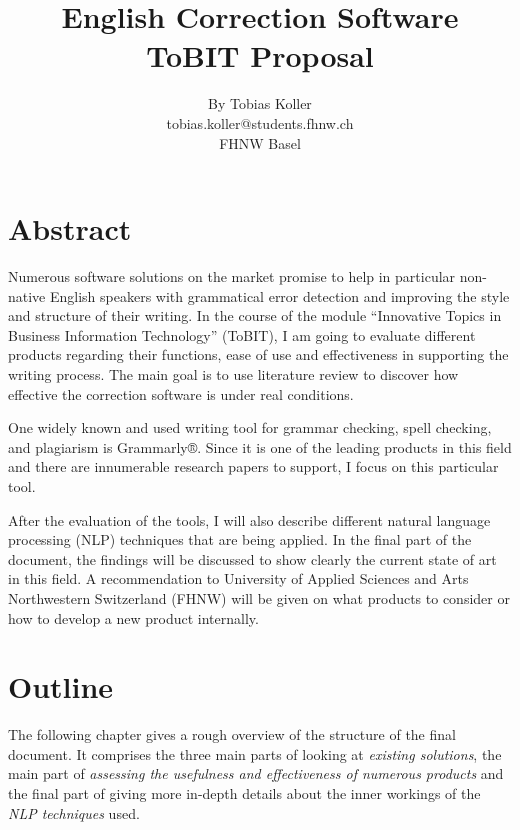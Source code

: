 \documentclass[a4paper,12pt,titlepage]{article}
\begin{document}
\title{\Large{\textbf{English Correction Software}}\\ ToBIT Proposal}
\author{By Tobias Koller \\ tobias.koller@students.fhnw.ch \\ FHNW Basel}

\maketitle
\let\cleardoublepage\clearpage
{}

\section{Abstract}
Numerous software solutions on the market promise to help in particular non-native English speakers with grammatical error detection and improving the style and structure of their writing. In the course of the module ``Innovative Topics in Business Information Technology'' (ToBIT), I am going to evaluate different products regarding their functions, ease of use and effectiveness in supporting the writing process. The main goal is to use literature review to discover how effective the correction software is under real conditions.

One widely known and used writing tool for grammar checking, spell checking, and plagiarism is Grammarly®. Since it is one of the leading products in this field and there are innumerable research papers to support, I focus on this particular tool.

After the evaluation of the tools, I will also describe different natural language processing (NLP) techniques that are being applied. In the final part of the document, the findings will be discussed to show clearly the current state of art in this field. A recommendation to University of Applied Sciences and Arts Northwestern Switzerland (FHNW) will be given on what products to consider or how to develop a new product internally.

\newpage


\tableofcontents
\newpage



\section{Outline}\label{sec:outl}
The following chapter gives a rough overview of the structure of the final document. It comprises the three main parts of looking at \textit{existing solutions}, the main part of \textit{assessing the usefulness and effectiveness of numerous products} and the final part of giving more in-depth details about the inner workings of the \textit{NLP techniques} used.
\end{document}
